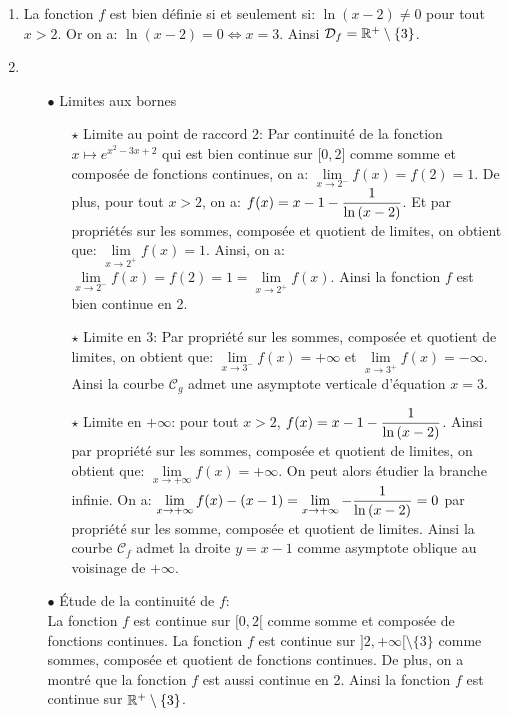 \documentclass[a4paper, 11pt,reqno]{article}
\begin{document}
\begin{correction}  \;
	\begin{enumerate}
		\item La fonction $f$ est bien d\'efinie si et seulement si: $\ln{(x-2)}\not= 0$ pour tout $x>2$. Or on a: $\ln{(x-2)}=0\Leftrightarrow x=3$. Ainsi $\mathcal{D}_f=\mathbb{R}^+\setminus \lbrace 3\rbrace$.
		\item
		      \begin{itemize}
			      \item[$\bullet$] Limites aux bornes
			            \begin{itemize}
				            \item[$\star$] Limite au point de raccord 2: Par continuit\'e de la fonction $x\mapsto e^{x^2-3x+2}$ qui est bien continue sur $\lbrack 0,2\rbrack$ comme somme et compos\'ee de fonctions continues, on a: $\lim\limits_{x\to 2^-} f(x)=f(2)=1$. De plus, pour tout $x>2$, on a: $f(x)=x-1-\displaystyle\frac{1}{\ln{(x-2)}}$. Et par propri\'et\'es sur les sommes, compos\'ee et quotient de limites, on obtient que: $\lim\limits_{x\to 2^+} f(x)=1$. Ainsi, on a: $\lim\limits_{x\to 2^-} f(x)=f(2)=1=\lim\limits_{x\to 2^+} f(x)$. Ainsi la fonction $f$ est bien continue en 2.
				            \item[$\star$] Limite en 3: Par propri\'et\'e sur les sommes, compos\'ee et quotient de limites, on obtient que: $\lim\limits_{x\to 3^-} f(x)=+\infty$ et $\lim\limits_{x\to 3^+} f(x)=-\infty$. Ainsi la courbe $\mathcal{C}_g$ admet une asymptote verticale d'\'equation $x=3$.
				            \item[$\star$] Limite en $+\infty$: pour tout $x>2$, $f(x)=x-1-\displaystyle\frac{1}{\ln{(x-2)}}$. Ainsi par propri\'et\'e sur les sommes, compos\'ee et quotient de limites, on obtient que: $\lim\limits_{x\to +\infty} f(x)=+\infty$. On peut alors \'etudier la branche infinie. On a: $\lim\limits_{x\to +\infty} f(x)-(x-1)=\lim\limits_{x\to +\infty} -\displaystyle\frac{1}{\ln{(x-2)}}=0$ par propri\'et\'e sur les somme, compos\'ee et quotient de limites. Ainsi la courbe $\mathcal{C}_f$ admet la droite $y=x-1$ comme asymptote oblique au voisinage de $+\infty$.
			            \end{itemize}
			      \item[$\bullet$] \'Etude de la continuit\'e de $f$: \\
			            \noindent La fonction $f$ est continue sur $\lbrack 0,2\lbrack$ comme somme et compos\'ee de fonctions continues. La fonction $f$ est continue sur $\rbrack 2,+\infty\lbrack\setminus\lbrace 3\rbrace$ comme sommes, compos\'ee et quotient de fonctions continues. De plus, on a montr\'e que la fonction $f$ est aussi continue en 2. Ainsi la fonction $f$ est continue sur $\mathbb{R}^+\setminus\lbrace 3\rbrace$.

\end{itemize}
\end{enumerate}
\end{correction}
\end{document}
